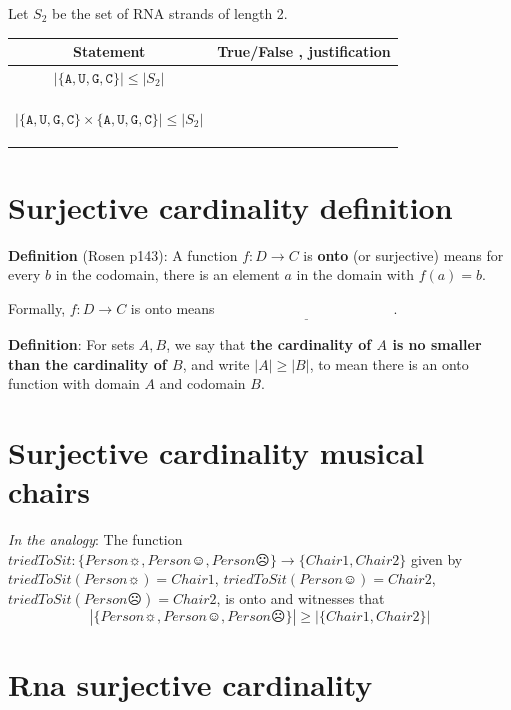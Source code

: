 \documentclass[12pt, oneside]{article}
\newcommand{\A}[0]{\texttt{A}}
\newcommand{\C}[0]{\texttt{C}}
\newcommand{\G}[0]{\texttt{G}}
\newcommand{\U}[0]{\texttt{U}}
\begin{document}
Let $S_2$ be the set of RNA strands of length 2.

\vspace{-20pt}

\begin{center}
\begin{tabular}{|c|p{5in}|}
\hline
Statement  &  True/False , justification \\
\hline
$| \{\A,\U,\G,\C\} | \leq |S_2 |$ &  \\
&\\&\\&\\
\hline
$| \{\A,\U,\G,\C\} \times \{\A, \U, \G,\C\} | \leq |S_2 |$ &  \\
&\\&\\&\\
\hline
\end{tabular}
\end{center} \vfill
\section*{Surjective cardinality definition}


{\bf Definition}  (Rosen p143): A function $f: D  \to C$ is {\bf onto} (or  surjective) means for every $b$ in the codomain, 
there  is an element $a$ in the domain with  $f(a) = b$.


Formally, $f: D  \to  C$ is  onto  means $\underline{\phantom{\forall b \in C  \exists a \in D ( f(a) = b)}}$.


{\bf Definition}:  For sets $A, B$, we say that  {\bf the  cardinality of $A$ is  no  smaller than the cardinality of  $B$}, and 
write $|A| \geq |B|$, to mean there is an onto function  with domain $A$  and codomain $B$.
 \vfill
\section*{Surjective cardinality musical chairs}


{\it In the analogy}: The function $triedToSit: \{ Person\sun, Person\smiley, Person\frownie \} \to  \{ Chair1, Chair2\} $ given
by $triedToSit(Person\sun) = Chair1$,  $triedToSit(Person\smiley) = Chair2$, 
$triedToSit(Person\frownie) = Chair2$, is onto and witnesses that 
\[
 |\{ Person\sun, Person\smiley, Person\frownie \}| \geq | \{ Chair1, Chair2\} |
\] \vfill
\section*{Rna surjective cardinality}
\end{document}
